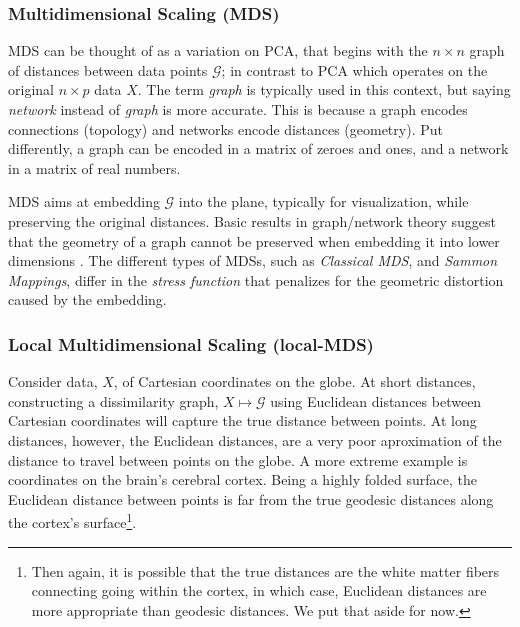 \documentclass[]{book}
\theoremstyle{definition}
\theoremstyle{definition}
\theoremstyle{definition}
\theoremstyle{remark}
\let\BeginKnitrBlock\begin \let\EndKnitrBlock\end
\begin{document}
\hypertarget{multidimensional-scaling-mds}{%
\subsubsection{Multidimensional Scaling (MDS)}\label{multidimensional-scaling-mds}}

MDS can be thought of as a variation on PCA, that begins with the \(n \times n\) graph of distances between data points \(\mathcal{G}\); in contrast to PCA which operates on the original \(n \times p\) data \(X\).
The term \emph{graph} is typically used in this context, but saying \emph{network} instead of \emph{graph} is more accurate. This is because a graph encodes connections (topology) and networks encode distances (geometry). Put differently, a graph can be encoded in a matrix of zeroes and ones, and a network in a matrix of real numbers.

MDS aims at embedding \(\mathcal{G}\) into the plane, typically for visualization, while preserving the original distances.
Basic results in graph/network theory suggest that the geometry of a graph cannot be preserved when embedding it into lower dimensions \citep{graham1988isometric}.
The different types of MDSs, such as \emph{Classical MDS}, and \emph{Sammon Mappings}, differ in the \emph{stress function} that penalizes for the geometric distortion caused by the embedding.

\hypertarget{loc-mds}{%
\subsubsection{Local Multidimensional Scaling (local-MDS)}\label{loc-mds}}

\BeginKnitrBlock{example}
\protect\hypertarget{exm:non-euclidean}{}{\label{exm:non-euclidean} }Consider data, \(X\), of Cartesian coordinates on the globe.
At short distances, constructing a dissimilarity graph, \(X \mapsto \mathcal{G}\) using Euclidean distances between Cartesian coordinates will capture the true distance between points.
At long distances, however, the Euclidean distances, are a very poor aproximation of the distance to travel between points on the globe.
A more extreme example is coordinates on the brain's cerebral cortex.
Being a highly folded surface, the Euclidean distance between points is far from the true geodesic distances along the cortex's surface\footnote{Then again, it is possible that the true distances are the white matter fibers connecting going within the cortex, in which case, Euclidean distances are more appropriate than geodesic distances. We put that aside for now.}.
\EndKnitrBlock{example}
\end{document}
